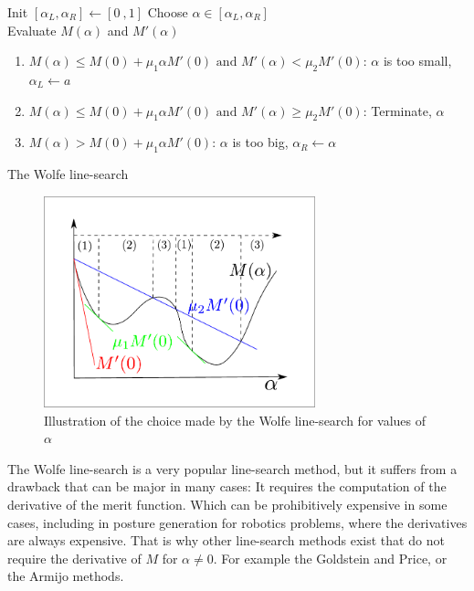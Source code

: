 \begin{algorithm}
\begin{algorithmic}
  \State Init $[\alpha_L,\alpha_R]\leftarrow[0\ ,1]$
  \Loop Choose $\alpha\in[\alpha_L,\alpha_R]$\\
  Evaluate $M(\alpha)$ and $M'(\alpha)$
  {\renewcommand\labelenumi{(\theenumi)}
  \begin{enumerate}
    \item {$M(\alpha) \leq M(0) + \mu_1 \alpha M'(0)\text{ and } M'(\alpha)<\mu_2 M'(0)$}: $\alpha$ is too small, $\alpha_L\leftarrow a$
    \item {$M(\alpha) \leq M(0) + \mu_1 \alpha M'(0) \text{ and } M'(\alpha)\geq\mu_2 M'(0)$}: Terminate, \Return $\alpha$
    \item {$M(\alpha) > M(0) + \mu_1 \alpha M'(0)$}: $\alpha$ is too big, $\alpha_R\leftarrow \alpha$
  \end{enumerate}
}
  \EndLoop
  \caption{The Wolfe line-search}
  \label{alg:Wolfe}
\end{algorithmic}
\end{algorithm}

\begin{figure}[ht]
  \centering
  \includegraphics[width=0.7\textwidth]{line-search.pdf}
  \caption{Illustration of the choice made by the Wolfe line-search for values of $\alpha$}
  \label{fig:Wolfe}
\end{figure}

The Wolfe line-search is a very popular line-search method, but it suffers from a drawback that can be major in many cases: It requires the computation of the derivative of the merit function.
Which can be prohibitively expensive in some cases, including in posture generation for robotics problems, where the derivatives are always expensive.
That is why other line-search methods exist that do not require the derivative of $M$ for $\alpha\neq0$. For example the Goldstein and Price, or the Armijo methods.


